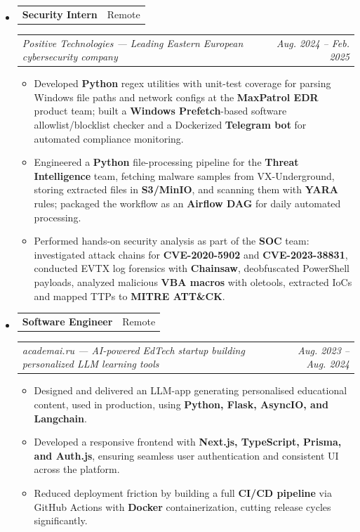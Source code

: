 \documentclass[11pt,letterpaper]{article}
\makeatletter
\newcommand{\headerrow}[2]
{\begin{tabular*}{\linewidth}{l@{\extracolsep{\fill}}r}
#1 & #2 \\
\end{tabular*}}
\makeatother
\begin{document}
\renewcommand\labelitemi{}
\renewcommand\labelitemii{$\bullet$}
\begin{itemize}[leftmargin=0em, itemsep=0.6em]
    \parskip=0.1em

    \item
    \headerrow
        {\textbf{Security Intern}}
        {Remote}
    \headerrow
        {\emph{Positive Technologies --- Leading Eastern European cybersecurity company}}
        {\emph{Aug. 2024 -- Feb. 2025}}
    \begin{itemize}[leftmargin=1.2em, itemsep=0.1em]
        \renewcommand\labelitemi{$\bullet$}
        \item Developed \textbf{Python} regex utilities with unit-test coverage for parsing Windows file paths and network configs at the \textbf{MaxPatrol EDR} product team; built a \textbf{Windows Prefetch}-based software allowlist/blocklist checker and a Dockerized \textbf{Telegram bot} for automated compliance monitoring.
        \item Engineered a \textbf{Python} file-processing pipeline for the \textbf{Threat Intelligence} team, fetching malware samples from VX-Underground, storing extracted files in \textbf{S3/MinIO}, and scanning them with \textbf{YARA} rules; packaged the workflow as an \textbf{Airflow DAG} for daily automated processing.
        \item Performed hands-on security analysis as part of the \textbf{SOC} team: investigated attack chains for \textbf{CVE-2020-5902} and \textbf{CVE-2023-38831}, conducted EVTX log forensics with \textbf{Chainsaw}, deobfuscated PowerShell payloads, analyzed malicious \textbf{VBA macros} with oletools, extracted IoCs and mapped TTPs to \textbf{MITRE ATT\&CK}.
    \end{itemize}

    \item
    \headerrow
        {\textbf{Software Engineer}}
        {Remote}
    \headerrow
        {\emph{academai.ru --- AI-powered EdTech startup building personalized LLM learning tools}}
        {\emph{Aug. 2023 -- Aug. 2024}}
    \begin{itemize}[leftmargin=1.2em, itemsep=0.1em]
        \renewcommand\labelitemi{$\bullet$}
        \item Designed and delivered an LLM-app generating personalised educational content,
              used in production, using \textbf{Python, Flask, AsyncIO, and Langchain}.
        \item Developed a responsive frontend with \textbf{Next.js, TypeScript, Prisma, and Auth.js},
              ensuring seamless user authentication and consistent UI across the platform.
        \item Reduced deployment friction by building a full \textbf{CI/CD pipeline} via GitHub Actions
              with \textbf{Docker} containerization, cutting release cycles significantly.
    \end{itemize}


\end{itemize}
\end{document}
